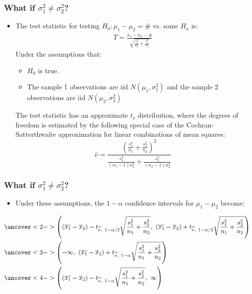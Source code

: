\documentclass[handout]{beamer}\usepackage[]{graphicx}\usepackage[]{color}
\providecommand{\ov}[1]{\overline{#1}}
\providecommand{\wh}[1]{\widehat{#1}}
\numberwithin{equation}{section}
\begin{document}
\begin{frame}
\frametitle{What if $\sigma_1^2 \ne \sigma_2^2$?} \small
\begin{itemize}

\pause \item The test statistic for testing $H_0: \mu_1 - \mu_2 = \#$ vs. some $H_a$ is:
\pause \begin{align*}
T = \frac{\ov{x}_1 - \ov{x}_2 - \#}{\sqrt{\frac{s_2^2}{n_2} + \frac{s_1^2}{n_1}}}
\end{align*}
Under the assumptions that:
\begin{itemize}
\pause \item $H_0$ is true.
\pause \item The sample 1 observations are iid $N(\mu_1, \sigma^2_1)$ and the sample 2 observations are iid $N(\mu_2, \sigma^2_2)$
\end{itemize}
The test statistic has an approximate $t_{\hat{\nu}}$ distribution, where the degrees of freedom is estimated
by the following special case of the Cochran-Satterthwaite
approximation for linear combinations of mean squares:
\[\hat{\nu} = \frac{\left(\frac{s_1^2}{n_1} + \frac{s_2^2}{n_2}\right)^2}{\frac{s_1^4}{(n_1 - 1)n_1^2} + \frac{s_2^4}{(n_2 - 1)n_2^2}}\]

\end{itemize}
\end{frame}


\begin{frame}
\frametitle{What if $\sigma_1^2 \ne \sigma_2^2$?} \scriptsize
\begin{itemize}
\item Under these assumptions, the $1 - \alpha$ confidence intervals for $\mu_1 - \mu_2$ become:
\end{itemize}
\begin{align*}
&\uncover<2->{\left ((\ov{x_1} - \ov{x}_2) - t_{\wh{\nu}, \ 1 - \alpha/2}  \sqrt{\frac{s_1^2}{n_1} + \frac{s_2^2}{n_2}} , \ (\ov{x_1} - \ov{x}_2) + t_{\wh{\nu}, \ 1 - \alpha/2} \sqrt{\frac{s_1^2}{n_1} + \frac{s_2^2}{n_2}} \right )} \\
&\uncover<3->{\left (-\infty , \ (\ov{x_1} - \ov{x}_2) + t_{\wh{\nu}, \ 1 - \alpha} \sqrt{\frac{s_1^2}{n_1} + \frac{s_2^2}{n_2}} \right )} \\
&\uncover<4->{\left ((\ov{x_1} - \ov{x}_2) - t_{\wh{\nu}, \ 1 - \alpha} \sqrt{\frac{s_1^2}{n_1} + \frac{s_2^2}{n_2}}, \ \infty \right ) }
\end{align*}
\end{frame}
\end{document}

